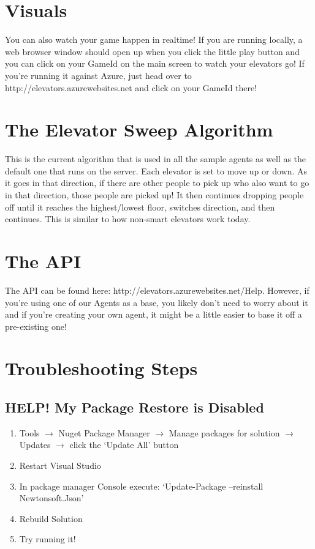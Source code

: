 \documentclass{article}
\begin{document}
\section*{Visuals}
You can also watch your game happen in realtime! If you are running locally, a web browser window should open up when you click the little play button and you can click on your GameId on the main screen to watch your elevators go! If you're running it against Azure, just head over to http://elevators.azurewebsites.net and click on your GameId there!

\newpage
\section*{The Elevator Sweep Algorithm}
This is the current algorithm that is used in all the sample agents as well as the default one that runs on the server. Each elevator is set to move up or down. As it goes in that direction, if there are other people to pick up who also want to go in that direction, those people are picked up! It then continues dropping people off until it reaches the highest/lowest floor, switches direction, and then continues. This is similar to how non-smart elevators work today.

\section*{The API}
The API can be found here: http://elevators.azurewebsites.net/Help. However, if you're using one of our Agents as a base, you likely don't need to worry about it and if you're creating your own agent, it might be a little easier to base it off a pre-existing one!

\section*{Troubleshooting Steps}
\subsection*{HELP! My Package Restore is Disabled}
\begin{enumerate}
	\item Tools $\to$ Nuget Package Manager $\to$ Manage packages for solution $\to$ Updates $\to$ click the ‘Update All’ button
	\item Restart Visual Studio
	\item In package manager Console execute: `Update-Package –reinstall Newtonsoft.Json'
	\item Rebuild Solution
	\item Try running it!
\end{enumerate}
\end{document}
